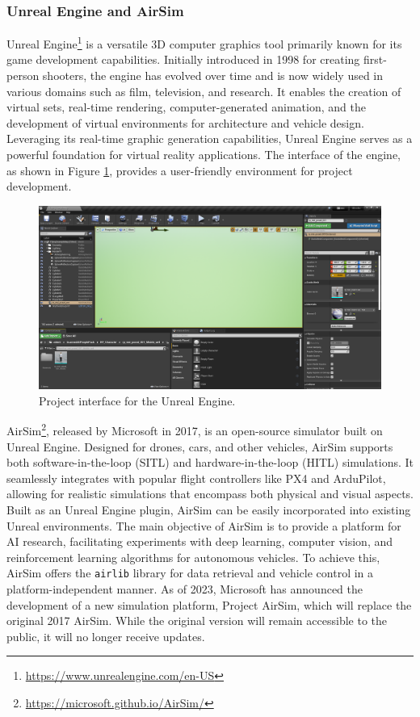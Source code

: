 \subsubsection{Unreal Engine and AirSim}
\label{subsec:unreal}

Unreal Engine\footnote{\url{https://www.unrealengine.com/en-US}} is a versatile 3D computer graphics tool primarily known for its game development capabilities. Initially introduced in 1998 for creating first-person shooters, the engine has evolved over time and is now widely used in various domains such as film, television, and research. It enables the creation of virtual sets, real-time rendering, computer-generated animation, and the development of virtual environments for architecture and vehicle design. Leveraging its real-time graphic generation capabilities, Unreal Engine serves as a powerful foundation for virtual reality applications. The interface of the engine, as shown in Figure \ref{fig:ue-interface}, provides a user-friendly environment for project development.

\begin{figure}
  \centering
  \includegraphics[width=\textwidth,keepaspectratio]{img/ue-interface.png}
  \caption{Project interface for the Unreal Engine.}\label{fig:ue-interface}
\end{figure}


AirSim\footnote{\url{https://microsoft.github.io/AirSim/}}, released by Microsoft in 2017, is an open-source simulator built on Unreal Engine. Designed for drones, cars, and other vehicles, AirSim supports both software-in-the-loop (SITL) and hardware-in-the-loop (HITL) simulations. It seamlessly integrates with popular flight controllers like PX4 and ArduPilot, allowing for realistic simulations that encompass both physical and visual aspects. Built as an Unreal Engine plugin, AirSim can be easily incorporated into existing Unreal environments. The main objective of AirSim is to provide a platform for AI research, facilitating experiments with deep learning, computer vision, and reinforcement learning algorithms for autonomous vehicles. To achieve this, AirSim offers the \texttt{airlib} library for data retrieval and vehicle control in a platform-independent manner. As of 2023, Microsoft has announced the development of a new simulation platform, Project AirSim, which will replace the original 2017 AirSim. While the original version will remain accessible to the public, it will no longer receive updates.

